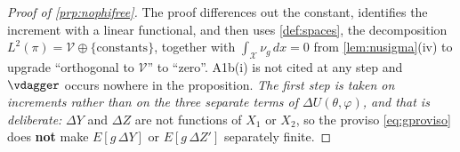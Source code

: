 \begin{proof}[Proof of \cref{prp:nophifree}]
The proof differences out the constant, identifies the increment with a linear functional, and then uses
\cref{def:spaces}, the decomposition $L^{2}(\pi)=\mathcal V\oplus\{\text{constants}\}$, together
with $\int_{\mathcal X}\nu_g\,dx=0$ from \cref{lem:nusigma}(iv) to upgrade ``orthogonal to
$\mathcal V$'' to ``zero''. A1b(i) is not cited at any step and
$\vdagger$ occurs nowhere in the proposition. \emph{The first step is
taken on increments rather than on the three separate terms of $\Delta U(\theta,\varphi)$, and that is
deliberate:} $\Delta Y$ and $\Delta Z$ are not functions of $X_1$ or $X_2$, so the proviso
\eqref{eq:gproviso} does \textbf{not} make $E[g\,\Delta Y]$ or $E[g\,\Delta Z']$ separately finite.


\end{proof}
